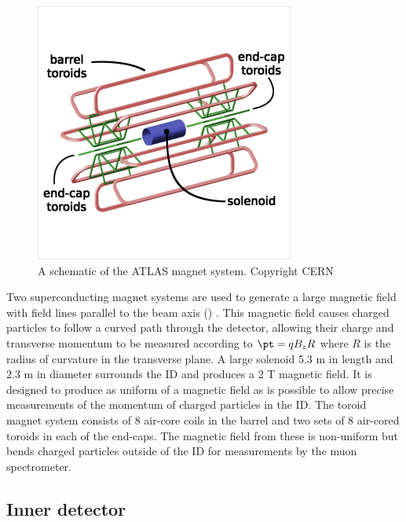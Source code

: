 \begin{figure}[t]
\includegraphics{atlas_magnets.png}
\caption{A schematic of the ATLAS magnet system. Copyright CERN}
\label{fig:atlas_magnets}
\end{figure}

Two superconducting magnet systems are used to generate a large magnetic field with field lines parallel to the beam axis () \cite{ATLAS:1997ae}. %
This magnetic field causes charged particles to follow a curved path through the detector, allowing their charge and transverse momentum to be measured according to \(  \pt = q B_z R\) where $R$ is the radius of curvature in the transverse plane.
A large solenoid 5.3 m in length and 2.3 m in diameter surrounds the ID and produces a 2 T magnetic field.
It is designed to produce as uniform of a magnetic field as is possible to allow precise measurements of the momentum of charged particles in the ID.
The toroid magnet system consists of 8 air-core coils in the barrel and two sets of 8 air-cored toroids in each of the end-caps.
The magnetic field from these is non-uniform but bends charged particles outside of the ID for measurements by the muon spectrometer.

\subsection{Inner detector}
\label{subsec:atlas_id}

